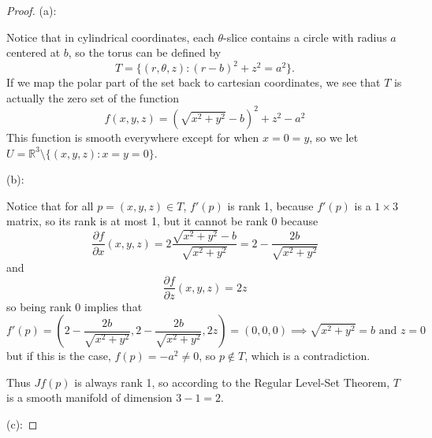 \documentclass{article}
\theoremstyle{plain} %
\numberwithin{thm}{section} %
\theoremstyle{definition}
\begin{document}
        \begin{proof}
            (a):

        Notice that in cylindrical coordinates, each \(\theta\)-slice contains a circle with radius \(a\) centered at \(b\), so the torus can be defined by
        \[
            T = \{ (r, \theta, z) : (r - b)^2 + z^2 = a^2\}.
        \]
        If we map the polar part of the set back to cartesian coordinates, we see that \(T\) is actually the zero set of the function
        \[
            f(x,y,z) = (\sqrt{x^2 + y^2} - b)^2 + z^2 - a^2
        \]
        This function is smooth everywhere except for when \(x = 0 = y\), so we let \(U = \mathbb{R}^3 \setminus \{ (x,y,z) : x = y = 0 \}\).

        \medskip

        (b):

        Notice that for all \(p = (x,y,z) \in T\), \(f'(p)\) is rank 1, because \(f'(p)\) is a \(1 \times 3\) matrix, so its rank is at most 1, but it cannot be rank 0 because
        \[
            \frac{\partial f}{\partial x} (x,y,z) = 2\frac{\sqrt{x^2 + y^2} - b}{\sqrt{x^2 + y^2}} = 2 - \frac{2b}{\sqrt{x^2 + y^2}}
        \]
        and
        \[
            \frac{\partial f}{\partial z} (x,y,z) = 2z
        \]
        so being rank 0 implies that
        \[
            f'(p) = \left( 2 - \frac{2b}{\sqrt{x^2 + y^2}}, 2 - \frac{2b}{\sqrt{x^2 + y^2}}, 2z \right) = (0,0,0) \implies \sqrt{x^2 + y^2} = b \text{ and } z = 0
        \]
        but if this is the case, \(f(p) = -a^2 \neq 0\), so \(p \notin T\), which is a contradiction.

        Thus \(Jf(p)\) is always rank 1, so according to the Regular Level-Set Theorem, \(T\) is a smooth manifold of dimension \(3 - 1 = 2\).

        \medskip

        (c):


\end{proof}
\end{document}
